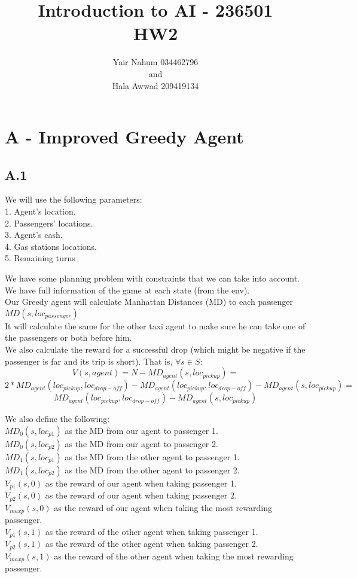 \documentclass[12pt]{article}
\title{Introduction to AI - 236501\\HW2}
\author{Yair Nahum 034462796\\and\\Hala Awwad 209419134 }
\begin{document}
\maketitle


\section*{A - Improved Greedy Agent}

\subsection*{A.1}

We will use the following parameters:\\
1. Agent's location.\\
2. Passengers' locations.\\
3. Agent's cash.\\
4. Gas stations locations.\\
5. Remaining turns

We have some planning problem with constraints that we can take into account.\\
We have full information of the game at each state (from the env).\\
Our Greedy agent will calculate Manhattan Distances (MD) to each passenger $MD(s,loc_{passenger})$\\
It will calculate the same for the other taxi agent to make sure he can take one of the passengers or both before him.\\
We also calculate the reward for a successful drop (which might be negative if the passenger is far and its trip is short). That is, $\forall s \in S $:
$$V(s,agent) =  N - MD_{agent}(s,loc_{pickup}) = $$
$$2 * MD_{agent}(loc_{pickup},loc_{drop-off}) - MD_{agent}(loc_{pickup},loc_{drop-off}) - MD_{agent}(s,loc_{pickup}) = $$
$$ MD_{agent}(loc_{pickup},loc_{drop-off}) - MD_{agent}(s,loc_{pickup})$$

We also define the following:\\
$MD_{0}(s,loc_{p1})$ as the MD from our agent to passenger 1.\\
$MD_{0}(s,loc_{p2})$ as the MD from our agent to passenger 2.\\
$MD_{1}(s,loc_{p1})$ as the MD from the other agent to passenger 1.\\
$MD_{1}(s,loc_{p2})$ as the MD from the other agent to passenger 2.\\
$V_{p1}(s,0)$ as the reward of our agent when taking passenger 1.\\
$V_{p2}(s,0)$ as the reward of our agent when taking passenger 2.\\
$V_{maxp}(s,0)$ as the reward of our agent when taking the most rewarding passenger.\\
$V_{p1}(s,1)$ as the reward of the other agent when taking passenger 1.\\
$V_{p2}(s,1)$ as the reward of the other agent when taking passenger 2.\\
$V_{maxp}(s,1)$ as the reward of the other agent when taking the most rewarding passenger.\\
\end{document}
